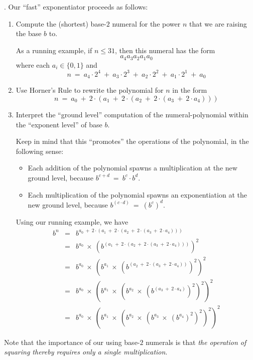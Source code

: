 .
Our ``fast'' exponentiator proceeds as follows:
\begin{enumerate}
\item
Compute the (shortest) base-$2$ numeral for the power $n$ that we are raising the base $b$ to.

\smallskip

As a running example, if $n \leq 31$, then this numeral has the form
\[ a_4 a_3 a_2 a_1 a_0 \]
where each $a_i \in \{0,1\}$ and
\[ n \ = \
a_4 \cdot 2^4 \ + \  a_3 \cdot 2^3 \ + \  a_2 \cdot 2^2 \ + \  a_1 \cdot 2^1 \ + \ a_0
\] 

\item
Use Horner's Rule to rewrite the polynomial for $n$ in the form
\[ n \ = \
a_0 \ + \ 2 \cdot (a_1 \ + \ 2 \cdot (a_2 \ + \ 2 \cdot (a_3 \ + \ 2 \cdot a_4 ))) \]

\item
Interpret the ``ground level'' computation of the numeral-polynomial within the ``exponent level'' of base $b$.

\smallskip

Keep in mind that this ``promotes'' the operations of the polynomial, in the following sense:
\begin{itemize}
\item
Each addition of the polynomial spawns a multiplication at the new ground level, because $b^{c + d} \ = \ b^c \cdot b^d$.
\item
Each multiplication of the polynomial spawns an exponentiation at the new ground level, because $b^{(c \cdot d)} \ = \ (b^c)^d$.
\end{itemize}

\smallskip

Using our running example, we have
\begin{eqnarray*}
b^n & = &
 b^{a_0 \ + \ 2 \cdot (a_1 \ + \ 2 \cdot (a_2 \ + \ 2 \cdot (a_3 \ + \
          2 \cdot a_4 )))} \\
    & = &
 b^{a_0} \ \times \ 
\left( b^{
(a_1 \ + \ 2 \cdot (a_2 \ + \ 2 \cdot (a_3 \ + \ 2 \cdot a_4 )))}
\right)^2 \\
    & = &
 b^{a_0} \ \times \
\left(
b^{a_1}  \ \times \
\left(
b^{(a_2 \ + \ 2 \cdot (a_3 \ + \ 2 \cdot a_4 ))}
\right)^2
\right)^2 \\
    & = &
b^{a_0} \ \times \
\left(
b^{a_1}  \ \times \
\left(
b^{a_2}  \ \times \
\left(
b^{(a_3 \ + \ 2 \cdot a_4 )}
\right)^2
\right)^2
\right)^2 \\
    & = &
b^{a_0} \ \times \
\left(
b^{a_1}  \ \times \
\left(
b^{a_2}  \ \times \
\left(
b^{a_3}  \ \times \
\left(
b^{a_4}
\right)^2
\right)^2
\right)^2
\right)^2
\end{eqnarray*}
\end{enumerate}
Note that the importance of our using base-$2$ numerals is that {\em the operation of squaring thereby requires only a single multiplication}.

